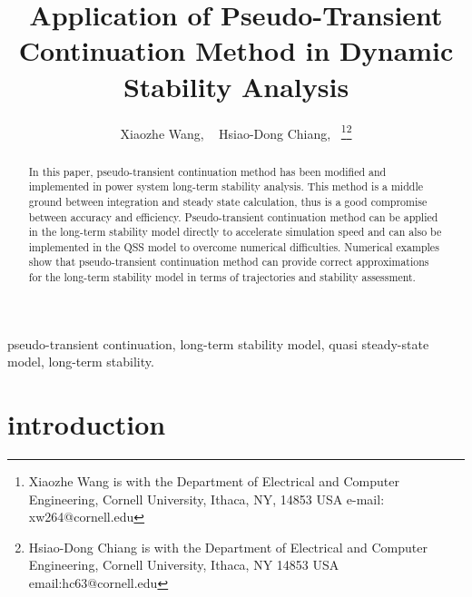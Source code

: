 \documentclass[journal]{IEEEtran}
\begin{document}
\title{Application of Pseudo-Transient Continuation Method in Dynamic Stability Analysis}

\author{Xiaozhe Wang,  ~
        Hsiao-Dong Chiang,~
\thanks{Xiaozhe Wang is with the Department
of Electrical and Computer Engineering, Cornell University, Ithaca,
NY, 14853 USA e-mail: xw264@cornell.edu}\thanks{Hsiao-Dong Chiang is with the Department of Electrical and Computer Engineering, Cornell University, Ithaca, NY 14853 USA email:hc63@cornell.edu}}

















\maketitle


\begin{abstract}
\boldmath
In this paper, pseudo-transient continuation method has been modified and implemented in power system long-term stability analysis. This method is a middle ground between integration and steady state calculation, thus is a good compromise between accuracy and efficiency. Pseudo-transient continuation method can be applied in the long-term stability model directly to accelerate simulation speed and can also be implemented in the QSS model to overcome numerical difficulties. Numerical examples show that pseudo-transient continuation method can provide correct approximations for the long-term stability model in terms of trajectories and stability assessment.
\end{abstract}

\begin{IEEEkeywords}
pseudo-transient continuation, long-term stability model, quasi steady-state model, long-term stability.
\end{IEEEkeywords}






\IEEEpeerreviewmaketitle



\section{introduction}
\end{document}

